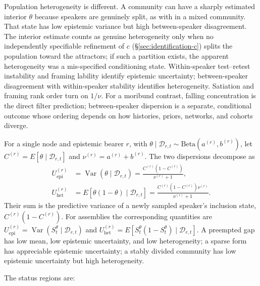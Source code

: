 Population heterogeneity is different. A community can have a sharply estimated
interior $\theta$ because speakers are genuinely split, as with  in a mixed community. That state has low epistemic variance but high
between-speaker disagreement. The interior estimate counts as genuine
heterogeneity only when no independently specifiable refinement of $c$
(\S\ref{sec:identification-c}) splits the population toward the attractors; if
such a partition exists, the apparent heterogeneity was a mis-specified
conditioning state. Within-speaker test--retest instability and
framing lability identify epistemic uncertainty; between-speaker disagreement
with within-speaker stability identifies heterogeneity. Satiation and framing
rank order turn on $1/\nu$. For a moribund contrast, falling concentration is
the direct filter prediction; between-speaker dispersion is a separate,
conditional outcome whose ordering depends on how histories, priors, networks,
and cohorts diverge.

For a single node and epistemic bearer $r$, with
$\theta\mid\mathcal{D}_{r,t}\sim\mathrm{Beta}(a^{(r)},b^{(r)})$, let
$C^{(r)}=E[\theta\mid\mathcal{D}_{r,t}]$ and
$\nu^{(r)}=a^{(r)}+b^{(r)}$. The two dispersions decompose as
\begin{align}
U^{(r)}_{\mathrm{epi}} &= \operatorname{Var}(\theta\mid\mathcal{D}_{r,t})
  =\frac{C^{(r)}(1-C^{(r)})}{\nu^{(r)}+1},\\
U^{(r)}_{\mathrm{het}} &= E[\theta(1-\theta)\mid\mathcal{D}_{r,t}]
  =\frac{C^{(r)}(1-C^{(r)})\nu^{(r)}}{\nu^{(r)}+1}.
\end{align}
Their sum is the predictive variance of a newly sampled speaker's inclusion
state, $C^{(r)}(1-C^{(r)})$. For assemblies the corresponding quantities are
$U^{(r)}_{\mathrm{epi}}=\operatorname{Var}(S_t^{\theta}\mid\mathcal{D}_{r,t})$
and
$U^{(r)}_{\mathrm{het}}=E[S_t^{\theta}(1-S_t^{\theta})\mid\mathcal{D}_{r,t}]$.
A
preempted gap has low mean, low epistemic uncertainty, and low heterogeneity; a
sparse form has appreciable epistemic uncertainty; a stably divided community
has low epistemic uncertainty but high heterogeneity.

The status regions are:

